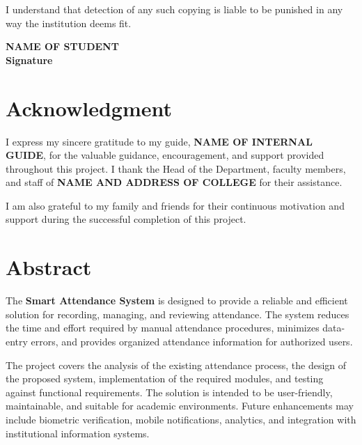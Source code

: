 \documentclass[12pt,a4paper]{report}
\newcommand{\ProjectTitleTitleCase}{Smart Attendance System}
\newcommand{\StudentName}{NAME OF STUDENT}
\newcommand{\GuideName}{NAME OF INTERNAL GUIDE}
\newcommand{\CollegeName}{NAME AND ADDRESS OF COLLEGE}
\newcommand{\frontmatterpage}{\clearpage\thispagestyle{empty}}
\begin{document}
I understand that detection of any such copying is liable to be punished in any way the institution deems fit.

\vfill
\begin{flushright}
\textbf{\StudentName}\\[0.6em]
\textbf{Signature}
\end{flushright}

\frontmatterpage
\chapter*{Acknowledgment}

I express my sincere gratitude to my guide, \textbf{\GuideName}, for the valuable guidance, encouragement, and support provided throughout this project. I thank the Head of the Department, faculty members, and staff of \textbf{\CollegeName} for their assistance.

I am also grateful to my family and friends for their continuous motivation and support during the successful completion of this project.

\frontmatterpage
\tableofcontents

\frontmatterpage
\chapter*{Abstract}

The \textbf{\ProjectTitleTitleCase} is designed to provide a reliable and efficient solution for recording, managing, and reviewing attendance. The system reduces the time and effort required by manual attendance procedures, minimizes data-entry errors, and provides organized attendance information for authorized users.

The project covers the analysis of the existing attendance process, the design of the proposed system, implementation of the required modules, and testing against functional requirements. The solution is intended to be user-friendly, maintainable, and suitable for academic environments. Future enhancements may include biometric verification, mobile notifications, analytics, and integration with institutional information systems.

\clearpage
{}
\setcounter{page}{1}
\end{document}
